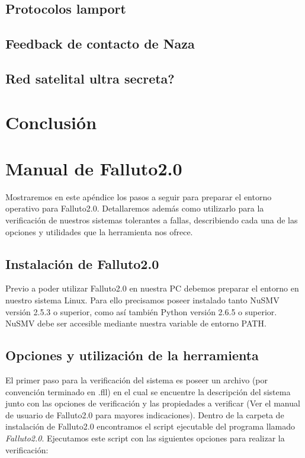 \documentclass[titlepage, 12pt]{book}
\begin{document}
			\section{Protocolos lamport}
			\section{Feedback de contacto de Naza}
			\section{Red satelital ultra secreta?}



\chapter{Conclusi\'on}



\appendix
\appendixpage
\noappendicestocpagenum
\addappheadtotoc

\chapter{Manual de Falluto2.0}
Mostraremos en este apéndice los pasos a seguir para preparar el entorno operativo para Falluto2.0. Detallaremos además como utilizarlo para la verificación de nuestros sistemas tolerantes a fallas, describiendo cada una de las opciones y utilidades que la herramienta nos ofrece.

\section{Instalación de Falluto2.0}
Previo a poder utilizar Falluto2.0 en nuestra PC debemos preparar el entorno en nuestro sistema Linux. Para ello precisamos poseer instalado tanto NuSMV versión 2.5.3 o superior, como así también Python versión 2.6.5 o superior. NuSMV debe ser accesible mediante nuestra variable de entorno PATH.

\section{Opciones y utilización de la herramienta}
El primer paso para la verificación del sistema es poseer un archivo (por convención terminado en .fll) en el cual se encuentre la descripción del sistema junto con las opciones de verificación y las propiedades a verificar (Ver el manual de usuario de Falluto2.0 para mayores indicaciones). Dentro de la carpeta de instalación de Falluto2.0 encontramos el script ejecutable del programa llamado \textit{Falluto2.0}. Ejecutamos este script con las siguientes opciones para realizar la verificación:
\end{document}
